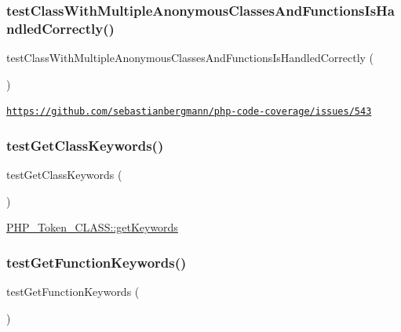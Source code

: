 \subsubsection{\texorpdfstring{test\+Class\+With\+Multiple\+Anonymous\+Classes\+And\+Functions\+Is\+Handled\+Correctly()}{testClassWithMultipleAnonymousClassesAndFunctionsIsHandledCorrectly()}}
{\footnotesize\ttfamily test\+Class\+With\+Multiple\+Anonymous\+Classes\+And\+Functions\+Is\+Handled\+Correctly (\begin{DoxyParamCaption}{ }\end{DoxyParamCaption})}

\href{https://github.com/sebastianbergmann/php-code-coverage/issues/543}{\tt https\+://github.\+com/sebastianbergmann/php-\/code-\/coverage/issues/543} \mbox{\label{class_p_h_p___token___class_test_a56704532cd7d8b048e19409ca53a75d4}} 
\subsubsection{\texorpdfstring{test\+Get\+Class\+Keywords()}{testGetClassKeywords()}}
{\footnotesize\ttfamily test\+Get\+Class\+Keywords (\begin{DoxyParamCaption}{ }\end{DoxyParamCaption})}

\mbox{\hyperlink{class_p_h_p___token_with_scope_and_visibility_a6f99615aae20ffeb2cc8c384a2ec353a}{P\+H\+P\+\_\+\+Token\+\_\+\+C\+L\+A\+S\+S\+::get\+Keywords}} \mbox{\label{class_p_h_p___token___class_test_aaccda96b7c08927d3c542dc6f4867dfd}} 
\subsubsection{\texorpdfstring{test\+Get\+Function\+Keywords()}{testGetFunctionKeywords()}}
{\footnotesize\ttfamily test\+Get\+Function\+Keywords (\begin{DoxyParamCaption}{ }\end{DoxyParamCaption})}

